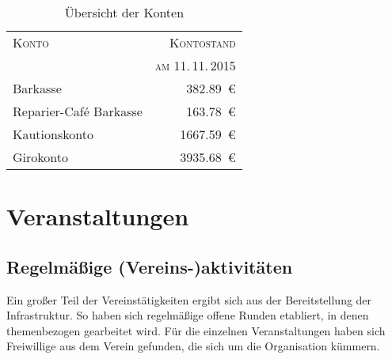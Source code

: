 \documentclass[ngerman]{scrartcl}
\begin{document}
\begin{table}[h!]
	\centering{}
	\begin{tabular}{l|r}
	\toprule
	\textsc{Konto} & \textsc{Kontostand} \\
	& \textsc{am 11.\,11.\,2015} \\
	\midrule
	Barkasse & \num{382,89}~\euro{} \\
	Reparier-Café Barkasse & \num{163,78}~\euro{} \\
	Kautionskonto & \num{1667,59}~\euro{} \\
	Girokonto & \num{3935,68}~\euro{}\\
	\bottomrule
	\end{tabular}
\caption{Übersicht der Konten}
\end{table}

\section{Veranstaltungen}

\subsection{Regelmäßige (Vereins-)aktivitäten}

Ein großer Teil der Vereinstätigkeiten ergibt sich aus der
Bereitstellung der Infrastruktur. So haben sich regelmäßige offene Runden
etabliert, in denen themenbezogen gearbeitet wird. Für die
einzelnen Veranstaltungen haben sich Freiwillige aus dem Verein
gefunden, die sich um die Organisation kümmern.
\end{document}
